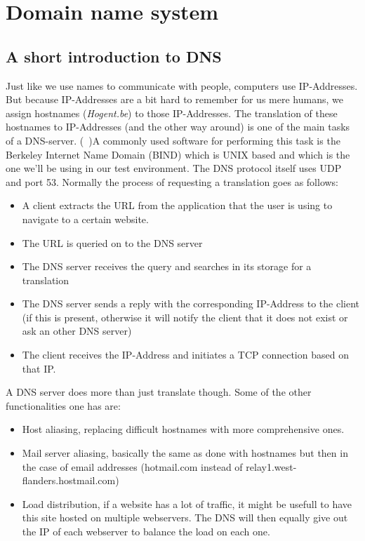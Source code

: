 \section{ Domain name system}
\subsection{A short introduction to DNS}
Just like we use names to communicate with people, computers use IP-Addresses. But because IP-Addresses are a bit hard to remember for us mere humans, we assign hostnames (\textit{Hogent.be}) to those IP-Addresses. The translation of these hostnames to IP-Addresses (and the other way around) is one of the main tasks of a DNS-server. (~\textcite{NetworkingPearson})A commonly used software for performing this task is the Berkeley Internet Name Domain (BIND) which is UNIX based and which is the one we'll be using in our test environment. The DNS protocol itself uses UDP and port 53. Normally the process of requesting a translation goes as follows:
\begin{itemize}
\item A client extracts the URL from the application that the user is using to navigate to a certain website.
\item The URL is queried on to the DNS server
\item The DNS server receives the query and searches in its storage for a translation
\item The DNS server sends a reply with the corresponding IP-Address to the client (if this is present, otherwise it will notify the client that it does not exist or ask an other DNS server)
\item The client receives the IP-Address and initiates a TCP connection based on that IP.
\end{itemize}
A DNS server does more than just translate though. Some of the other functionalities one has are:
\begin{itemize}
\item Host aliasing, replacing difficult hostnames with more comprehensive ones.
\item Mail server aliasing, basically the same as done with hostnames but then in the case of email addresses (hotmail.com instead of relay1.west-flanders.hostmail.com)
\item Load distribution, if a website has a lot of traffic, it might be usefull to have this site hosted on multiple webservers. The DNS will then equally give out the IP of each webserver to balance the load on each one.
\end{itemize}
